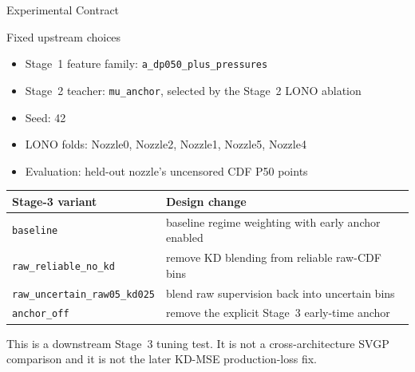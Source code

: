 \documentclass[UTF8,aspectratio=169]{ctexbeamer}
\begin{document}
\begin{frame}{Experimental Contract}
\small
\begin{block}{Fixed upstream choices}
\begin{itemize}\setlength\itemsep{2pt}
  \item Stage~1 feature family: \texttt{a\_dp050\_plus\_pressures}
  \item Stage~2 teacher: \texttt{mu\_anchor}, selected by the Stage~2 LONO ablation
  \item Seed: 42
  \item LONO folds: Nozzle0, Nozzle2, Nozzle1, Nozzle5, Nozzle4
  \item Evaluation: held-out nozzle's uncensored CDF P50 points
\end{itemize}
\end{block}

\vspace{0.35em}
\begin{center}
\renewcommand{\arraystretch}{1.18}
\setlength{\tabcolsep}{5pt}
\begin{tabular}{@{}L{4.2cm}L{7.7cm}@{}}
\toprule
\textbf{Stage-3 variant} & \textbf{Design change} \\
\midrule
\texttt{baseline} & baseline regime weighting with early anchor enabled \\
\texttt{raw\_reliable\_no\_kd} & remove KD blending from reliable raw-CDF bins \\
\texttt{raw\_uncertain\_raw05\_kd025} & blend raw supervision back into uncertain bins \\
\texttt{anchor\_off} & remove the explicit Stage~3 early-time anchor \\
\bottomrule
\end{tabular}
\end{center}

\vspace{0.3em}
\footnotesize
This is a downstream Stage~3 tuning test. It is not a cross-architecture SVGP comparison
and it is not the later KD-MSE production-loss fix.
\end{frame}
\end{document}
